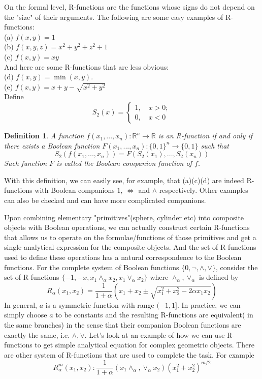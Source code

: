 \documentclass[12pt]{amsart}
\newtheorem{definition}{Definition}%
\theoremstyle{definition}
\begin{document}
On the formal level, R-functions are the functions whose signs do not depend on the "size" of their arguments.  The following are some easy  examples of R-functions: \\
(a) $f(x,y)=1$\\
(b) $f(x,y,z)=x^2+y^2+z^2+1$\\
(c) $f(x,y)=xy$\\
And here are some R-functions that are less obvious:\\
(d) $f(x,y)=\min(x,y)$. \\
(e) $f(x,y)=x+y-\sqrt{x^2+y^2}$\\
Define 
$$S_2(x)=\begin{cases} 1,\quad x>0;\\ 0, \quad x<0\end{cases}$$
\begin{definition}
A function $f(x_1,...,x_n):\mathbb{R}^n\to\mathbb{R}$ is an R-function if and only if there exists a Boolean function $F(x_1,...,x_n):\{0,1\}^n\to \{0,1\}$ such that
$$S_2(f(x_1,...,x_n))=F(S_2(x_1),...,S_2(x_n))$$
Such function $F$ is called the Boolean companion function of $f$.
\end{definition}
With this definition, we can easily see, for example,   that (a)(c)(d) are indeed R-functions with Boolean companions $1$, $\Leftrightarrow$ and $\wedge$ respectively. Other examples can also be checked and can have more complicated companions. 

Upon combining elementary "primitives"(sphere, cylinder etc) into composite objects with Boolean operations, we can actually construct certain R-functions that allows us to operate on the formulae/functions of those primitives and get a single analytical expression for the composite objects. And the set of R-functions used to define these operations has a natural correspondence to the Boolean functions. For the complete system of Boolean functions $\{0, \neg, \wedge, \vee\}$, consider the set of R-functions $\{-1,-x, x_1\wedge_\alpha x_2, x_1\vee_\alpha x_2\}$ where $\wedge_\alpha, \vee_\alpha$ is defined by
$$R_\alpha(x_1,x_2)=\frac{1}{1+\alpha} (x_1+x_2\pm \sqrt{x_1^2+x_2^2-2\alpha x_1x_2})$$
In general, $a$ is a symmetric function with range $(-1,1]$. In practice, we can simply choose $a$ to be constants and the resulting R-functions are equivalent( in the same branches) in the sense that their companion Boolean functions are exactly the same, i.e. $\wedge,\vee$. Let's look at an example of how we can use R-functions to get simple analytical equation for complex geometric objects. There are other system of R-functions that are used to complete the task. For example
$$R_{\alpha}^m(x_1,x_2): \frac{1}{1+\alpha} (x_1 \wedge_\alpha ,\vee_\alpha x_2)(x_1^2+x_2^2)^{m/2}$$
\end{document}

